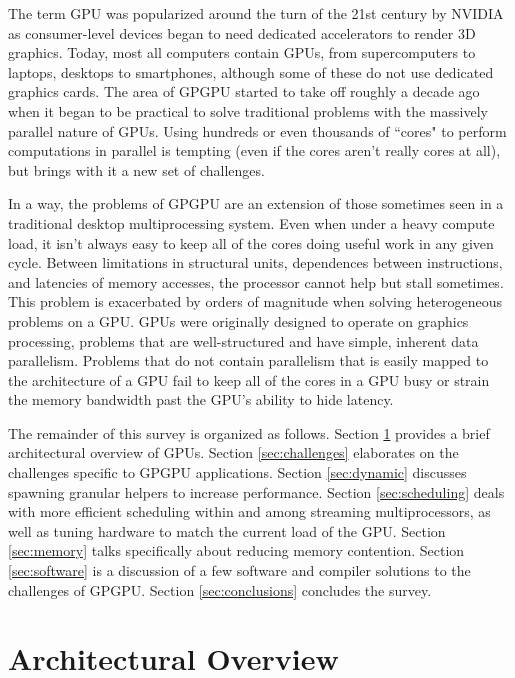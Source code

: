 \documentclass[prodmode,acmtecs]{acmsmall} %
\begin{document}
The term GPU was popularized around the turn of the 21st century by NVIDIA as
consumer-level devices began to need dedicated accelerators to render 3D
graphics. Today, most all computers contain GPUs, from supercomputers to
laptops, desktops to smartphones, although some of these do not use dedicated
graphics cards. The area of GPGPU started to take off roughly a decade ago when
it began to be practical to solve traditional problems with the massively
parallel nature of GPUs. Using hundreds or even thousands of ``cores" to perform
computations in parallel is tempting (even if the cores aren't really cores at
all), but brings with it a new set of challenges.

In a way, the problems of GPGPU are an extension of those sometimes seen in a
traditional desktop multiprocessing system. Even when under a heavy compute
load, it isn't always easy to keep all of the cores doing useful work in any
given cycle. Between limitations in structural units, dependences between
instructions, and latencies of memory accesses, the processor cannot help but
stall sometimes. This problem is exacerbated by orders of magnitude when solving
heterogeneous problems on a GPU. GPUs were originally designed to operate on
graphics processing, problems that are well-structured and have simple, inherent
data parallelism. Problems that do not contain parallelism that is easily mapped
to the architecture of a GPU fail to keep all of the cores in a GPU busy or
strain the memory bandwidth past the GPU's ability to hide latency.

The remainder of this survey is organized as follows. Section
\ref{sec:architecture} provides a brief architectural overview of GPUs. Section
\ref{sec:challenges} elaborates on the challenges specific to GPGPU
applications. Section \ref{sec:dynamic} discusses spawning granular helpers to
increase performance. Section \ref{sec:scheduling} deals with more efficient
scheduling within and among streaming multiprocessors, as well as tuning
hardware to match the current load of the GPU. Section \ref{sec:memory} talks
specifically about reducing memory contention. Section \ref{sec:software} is a
discussion of a few software and compiler solutions to the challenges of GPGPU.
Section
\ref{sec:conclusions} concludes the survey.

\section{Architectural Overview} \label{sec:architecture}
\end{document}
